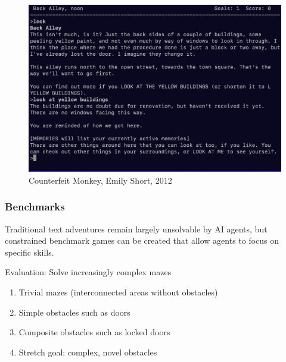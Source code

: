 \begin{frame}[b]
    \begin{figure}
        \centering
        \includegraphics[width=\textwidth,keepaspectratio]{../images/counterfeit_monkey.png}
        \caption*{Counterfeit Monkey, Emily Short, 2012}
    \end{figure}
\end{frame}

\begin{frame}

    \frametitle{Benchmarks}

    Traditional text adventures remain largely unsolvable by AI agents,
    but constrained benchmark games can be created that allow agents to
    focus on specific skills.

    \begin{block}{Evaluation: Solve increasingly complex mazes}
        \begin{enumerate}
            \item Trivial mazes (interconnected areas without obstacles) 
            \item Simple obstacles such as doors
            \item Composite obstacles such as locked doors
            \item Stretch goal: complex, novel obstacles
        \end{enumerate}

    \end{block}

\end{frame}
